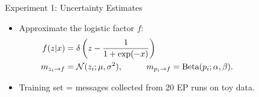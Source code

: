 \documentclass[english]{beamer}
\newcommand{\factor}{f}				%
\newcommand{\msg}[2]{m_{#1 \rightarrow #2}}			%
\begin{document}
\begin{frame}
\begin{columns}[t]
\begin{block}{ Experiment 1: Uncertainty Estimates}
\begin{itemize}

\item Approximate the logistic factor $f$: 
    \begin{align*}
    f(z|x) &= \delta\left(z-\frac{1}{1+\exp(-x)}\right)  \\
    \msg{z_i}{\factor} &= \mathcal{N}(z_i; \mu, \sigma^2), \hspace{10mm} 
    \msg{p_i}{\factor} = \text{Beta}(p_i; \alpha, \beta). 
    \end{align*}
    \vspace{-10mm}

\item Training set = messages collected from 20 EP runs on toy data.


\end{itemize}
\end{block}
\end{columns}
\end{frame}
\end{document}

